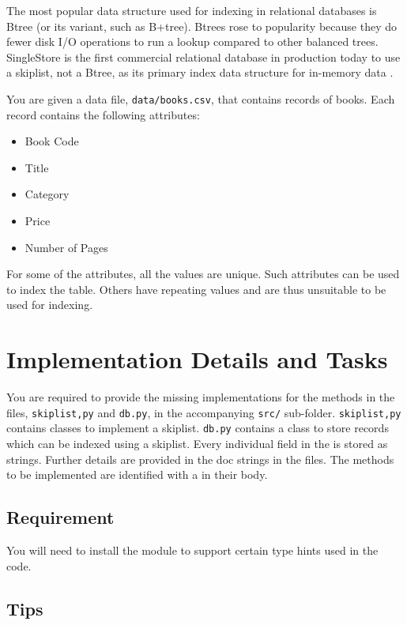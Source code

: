 \documentclass[addpoints]{exam}
\begin{document}
The most popular data structure used for indexing in relational databases is Btree (or its variant, such as B+tree). Btrees rose to popularity because they do fewer disk I/O operations to run a lookup compared to other balanced trees. SingleStore is the first commercial relational database in production today to use a skiplist, not a Btree, as its primary index data structure for in-memory data \cite{singlestore}.

You are given a data file, \texttt{data/books.csv}, that contains records of books. Each record contains the following attributes:
\begin{itemize}
\item Book Code
\item Title
\item Category
\item Price
\item Number of Pages
\end{itemize}
For some of the attributes, all the values are unique. Such attributes can be used to index the table. Others have repeating values and are thus unsuitable to be used for indexing.

\section{Implementation Details and Tasks}

You are required to provide the missing implementations for the methods in the files, \texttt{skiplist,py} and \texttt{db.py}, in the accompanying \texttt{src/} sub-folder. \texttt{skiplist,py} contains classes to implement a skiplist. \texttt{db.py} contains a  class to store records which can be indexed using a skiplist. Every individual field in the  is stored as strings. Further details are provided in the doc strings in the files. The methods to be implemented are identified with a  in their body.

  \subsection{Requirement}

  You will need to install the  module to support certain type hints used in the code.

  \subsection{Tips}
\end{document}
